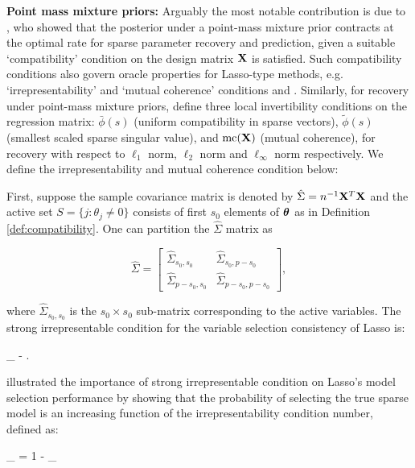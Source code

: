 \documentclass[sts,preprint]{imsart}
\begin{document}
\vspace{0.1in}
\noindent \textbf{Point mass mixture priors:} Arguably the most notable contribution is due to \citet{castillo2015bayesian}, who showed that the posterior under a point-mass mixture prior contracts at the optimal rate for sparse parameter recovery and prediction, given a suitable `compatibility' condition on the design matrix ${\bf X}$ is satisfied. Such compatibility conditions also govern oracle properties for Lasso-type methods, e.g. `irrepresentability' and `mutual coherence' conditions \citep[\textit{vide} Ch. 6]{buhlmann2011statistics} and \citep{zhao2006model}. Similarly, for recovery under point-mass mixture priors, \citet{castillo2015bayesian} define three local invertibility conditions on the regression matrix: $\bar{\phi}(s)$ (uniform compatibility in sparse vectors), $\tilde{\phi}(s)$ (smallest scaled sparse singular value), and $\text{mc}({\bf X})$ (mutual coherence), for recovery with respect to $\ell_1$ norm, $\ell_2$ norm and $\ell_{\infty}$ norm respectively. We define the irrepresentability and mutual coherence condition below:

First, suppose the sample covariance matrix is denoted by $\hat{\Sigma} = n^{-1} {\bf X}^T {\bf X}$ and the active set $S = \{ j : \theta_j \ne 0 \}$ consists of first $s_0$ elements of $\boldsymbol{\theta}$ as in Definition \ref{def:compatibility}. One can partition the $\hat{\Sigma}$ matrix as 

\[
\hat{\Sigma} = \begin{bmatrix} 
	\hat{\Sigma}_{s_0, s_0} & \hat{\Sigma}_{s_0, p - s_0} \\
  \hat{\Sigma}_{p-s_0, s_0} & \hat{\Sigma}_{p-s_0, p - s_0}   
								\end{bmatrix},
\]

where $\hat{\Sigma}_{s_0, s_0}$ is the $s_0 \times s_0$ sub-matrix corresponding to the active variables. The strong irrepresentable condition for the variable selection consistency of Lasso is: 

\beq 
{}_{\infty}  - \eta \;  \eta. \label{eq:irrep}
\eeq

\citet{zhao2006model} illustrated the importance of strong irrepresentable condition on Lasso's model selection performance by showing that the probability of selecting the true sparse model is an increasing function of the irrepresentability condition number, defined as:

\beq
\eta_{\infty} = 1 - _{\infty} \label{eq:eta_infty}
\eeq
\end{document}
